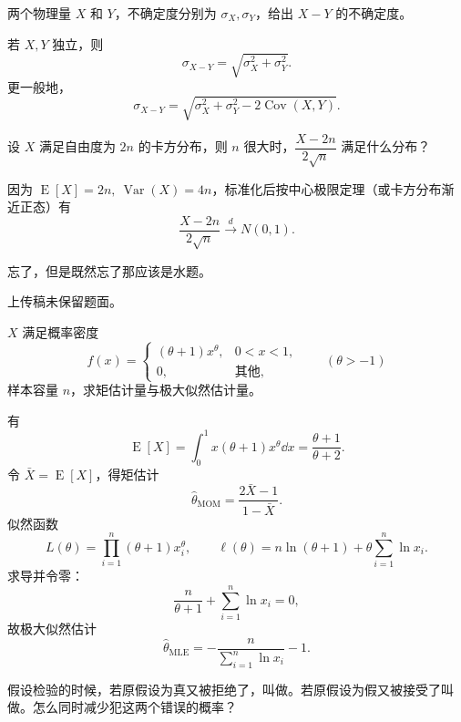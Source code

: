﻿

\begin{question}
两个物理量 $X$ 和 $Y$，不确定度分别为 $\sigma_X,\sigma_Y$，给出 $X-Y$ 的不确定度。
\begin{solution}
若 $X,Y$ 独立，则
\[
\sigma_{X-Y}=\sqrt{\sigma_X^2+\sigma_Y^2}.
\]
更一般地，
\[
\sigma_{X-Y}=\sqrt{\sigma_X^2+\sigma_Y^2-2\operatorname{Cov}(X,Y)}.
\]
\end{solution}
\end{question}

\begin{question}
设 $X$ 满足自由度为 $2n$ 的卡方分布，则 $n$ 很大时，$\dfrac{X-2n}{2\sqrt n}$ 满足什么分布？
\begin{solution}
因为 $\operatorname{E}[X]=2n,\ \operatorname{Var}(X)=4n$，标准化后按中心极限定理（或卡方分布渐近正态）有
\[
\frac{X-2n}{2\sqrt n}\xrightarrow[]{d}N(0,1).
\]
\end{solution}
\end{question}

\begin{question}
忘了，但是既然忘了那应该是水题。
\begin{solution}
上传稿未保留题面。
\end{solution}
\end{question}

\begin{question}
$X$ 满足概率密度
\[
f(x)=\begin{cases}
(\theta+1)x^{\theta},&0<x<1,\\
0,&\text{其他},
\end{cases}
\qquad (\theta>-1)
\]
样本容量 $n$，求矩估计量与极大似然估计量。
\begin{solution}
有
\[
\operatorname{E}[X]=\int_0^1 x(\theta+1)x^{\theta}\dd{x}=\frac{\theta+1}{\theta+2}.
\]
令 $\bar X=\operatorname{E}[X]$，得矩估计
\[
\hat\theta_{\mathrm{MOM}}=\frac{2\bar X-1}{1-\bar X}.
\]
似然函数
\[
L(\theta)=\prod_{i=1}^n (\theta+1)x_i^{\theta},
\qquad
\ell(\theta)=n\ln(\theta+1)+\theta\sum_{i=1}^n\ln x_i.
\]
求导并令零：
\[
\frac{n}{\theta+1}+\sum_{i=1}^n\ln x_i=0,
\]
故极大似然估计
\[
\hat\theta_{\mathrm{MLE}}=-\frac{n}{\sum_{i=1}^n\ln x_i}-1.
\]
\end{solution}
\end{question}

\begin{question}
假设检验的时候，若原假设为真又被拒绝了，叫做\underline{\hspace{2em}}。若原假设为假又被接受了叫做\underline{\hspace{2em}}。怎么同时减少犯这两个错误的概率？
\begin{solution}

\end{solution}
\end{question}

